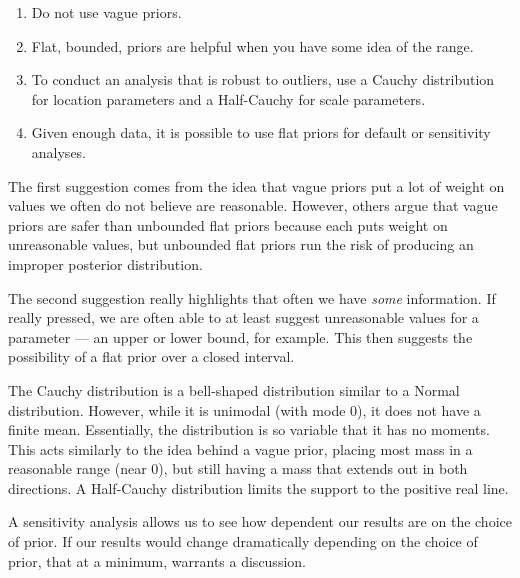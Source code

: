 \documentclass[
  letterpaper,
  DIV=11,
  numbers=noendperiod]{scrreprt}
\providecommand{\tightlist}{%
  \setlength{\itemsep}{0pt}\setlength{\parskip}{0pt}}\usepackage{longtable,booktabs,array}
\theoremstyle{definition}
\theoremstyle{plain}
\theoremstyle{definition}
\theoremstyle{remark}
\begin{document}
\begin{enumerate}
\def\labelenumi{\arabic{enumi}.}
\tightlist
\item
  Do not use vague priors.
\item
  Flat, bounded, priors are helpful when you have some idea of the
  range.
\item
  To conduct an analysis that is robust to outliers, use a Cauchy
  distribution for location parameters and a Half-Cauchy for scale
  parameters.
\item
  Given enough data, it is possible to use flat priors for default or
  sensitivity analyses.
\end{enumerate}

The first suggestion comes from the idea that vague priors put a lot of
weight on values we often do not believe are reasonable. However, others
argue that vague priors are safer than unbounded flat priors because
each puts weight on unreasonable values, but unbounded flat priors run
the risk of producing an improper posterior distribution.

The second suggestion really highlights that often we have \emph{some}
information. If really pressed, we are often able to at least suggest
unreasonable values for a parameter --- an upper or lower bound, for
example. This then suggests the possibility of a flat prior over a
closed interval.

The Cauchy distribution is a bell-shaped distribution similar to a
Normal distribution. However, while it is unimodal (with mode 0), it
does not have a finite mean. Essentially, the distribution is so
variable that it has no moments. This acts similarly to the idea behind
a vague prior, placing most mass in a reasonable range (near 0), but
still having a mass that extends out in both directions. A Half-Cauchy
distribution limits the support to the positive real line.

A sensitivity analysis allows us to see how dependent our results are on
the choice of prior. If our results would change dramatically depending
on the choice of prior, that at a minimum, warrants a discussion.
\end{document}
